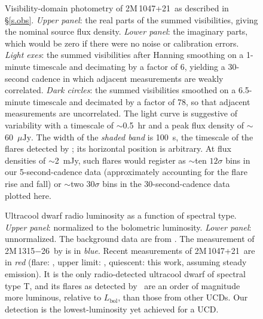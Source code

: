 \documentclass[iop]{emulateapj}
\newcommand\ujy{\ensuremath{\mu\text{Jy}}}
\newcommand\vtwom{2M\,1047+21} %
\newcommand\vjthirt{2M\,1315$-$26}
\newcommand\apx{\ensuremath{\sim}}
\begin{document}
\begin{figure}[p]
\caption{Visibility-domain photometry of \vtwom\ as described in
  \S\ref{s.obs}. \textit{Upper panel}: the real parts of the summed
  visibilities, giving the nominal source flux density. \textit{Lower panel}:
  the imaginary parts, which would be zero if there were no noise or
  calibration errors. \textit{Light exes}: the summed visibilities after
  Hanning smoothing on a 1-minute timescale and decimating by a factor of 6,
  yielding a 30-second cadence in which adjacent measurements are weakly
  correlated. \textit{Dark circles}: the summed visibilities smoothed on a
  6.5-minute timescale and decimated by a factor of 78, so that adjacent
  measurements are uncorrelated. The light curve is suggestive of variability
  with a timescale of \apx0.5~hr and a peak flux density of \apx60~\ujy. The
  width of the \textit{shaded band} is 100~s, the timescale of the flares
  detected by \rw; its horizontal position is arbitrary. At flux densities of
  \apx 2~mJy, such flares would register as \apx ten $12\sigma$ bins in our
  5-second-cadence data (approximately accounting for the flare rise and fall)
  or \apx two $30\sigma$ bins in the 30-second-cadence data plotted here.}
\label{f.photom}
\end{figure}

\begin{figure}[p]
\caption{Ultracool dwarf radio luminosity as a function of spectral type.
  \textit{Upper panel}: normalized to the bolometric luminosity. \textit{Lower
    panel}: unnormalized. The background data are from \citet[and references
    therein]{mbr12}. The measurement of \vjthirt\ by \citet{bmzb13} is in
  \textit{blue}. Recent measurements of \vtwom\ are in \textit{red} (flare:
  \rw, upper limit: \citet{b06b}, quiescent: this work, assuming steady
  emission). It is the only radio-detected ultracool dwarf of spectral type T,
  and its flares as detected by \rw\ are an order of magnitude more luminous,
  relative to $L_\text{bol}$, than those from other UCDs. Our detection is the
  lowest-luminosity yet achieved for a UCD.}
\label{f.rlrad}
\end{figure}
\end{document}
